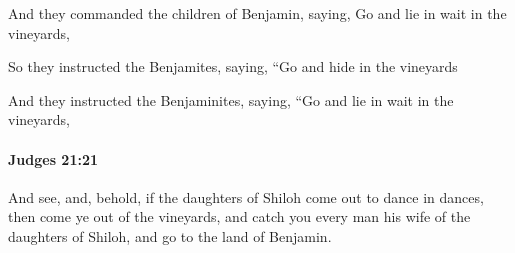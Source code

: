 			\begin{versebox}
					\item[BHS] 
					\item[ASV] And they commanded the children of Benjamin, saying, Go and lie in wait in the vineyards,
					\item[NIV] So they instructed the Benjamites, saying, “Go and hide in the vineyards
					\item[NRSV] And they instructed the Benjaminites, saying, “Go and lie in wait in the vineyards,
			\end{versebox}

		\paragraph{Judges 21:21} %
			\label{JUDGES-21-21}

			And see, and, behold, if the daughters of Shiloh come out to dance in dances, then come ye out of the vineyards, and catch you every man his wife of the daughters of Shiloh, and go to the land of Benjamin.

